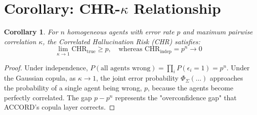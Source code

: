 \documentclass[11pt,a4paper]{article}
\newtheorem{corollary}{Corollary}
\begin{document}
\section{Corollary: CHR-$\kappa$ Relationship}

\begin{corollary}
For $n$ homogeneous agents with error rate $p$ and maximum pairwise correlation $\kappa$, the Correlated Hallucination Risk (CHR) satisfies:
\begin{equation}
\lim_{\kappa \to 1} \text{CHR}_{\text{true}} \geq p, \quad \text{whereas } \text{CHR}_{\text{indep}} = p^n \to 0
\end{equation}
\end{corollary}

\begin{proof}
Under independence, $P(\text{all agents wrong}) = \prod_i P(\epsilon_i=1) = p^n$. 
Under the Gaussian copula, as $\kappa \to 1$, the joint error probability $\Phi_\Sigma(\dots)$ approaches the probability of a single agent being wrong, $p$, because the agents become perfectly correlated. The gap $p - p^n$ represents the "overconfidence gap" that ACCORD's copula layer corrects.
\end{proof}
\end{document}
